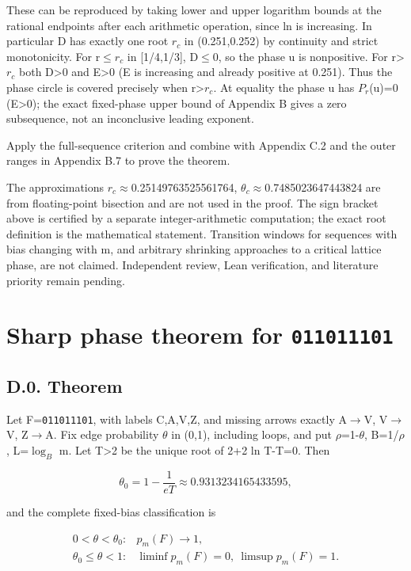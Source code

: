 \documentclass[11pt]{article}
\begin{document}
These can be reproduced by taking lower and upper logarithm bounds at the rational endpoints after each arithmetic operation, since ln is increasing. In particular D has exactly one root $r_{c}$ in (0.251,0.252) by continuity and strict monotonicity. For r\ensuremath{\leq}$r_{c}$ in [1/4,1/3], D\ensuremath{\leq}0, so the phase u is nonpositive. For r>$r_{c}$ both D>0 and E>0 (E is increasing and already positive at 0.251). Thus the phase circle is covered precisely when r>$r_{c}$. At equality the phase u has $P_{r}$(u)=0 (E>0); the exact fixed-phase upper bound of Appendix B gives a zero subsequence, not an inconclusive leading exponent.

Apply the full-sequence criterion and combine with Appendix C.2 and the outer ranges in Appendix B.7 to prove the theorem.

The approximations $r_{c}$\ensuremath{\approx}0.25149763525561764, $\theta_{c}$\ensuremath{\approx}0.7485023647443824 are from floating-point bisection and are not used in the proof. The sign bracket above is certified by a separate integer-arithmetic computation; the exact root definition is the mathematical statement. Transition windows for sequences with bias changing with m, and arbitrary shrinking approaches to a critical lattice phase, are not claimed. Independent review, Lean verification, and literature priority remain pending.

\section{Sharp phase theorem for \texttt{011011101}}

\subsection*{D.0. Theorem}

Let F=\texttt{011011101}, with labels C,A,V,Z, and missing arrows exactly A\ensuremath{\to}V, V\ensuremath{\to}V, Z\ensuremath{\to}A. Fix edge probability $\theta$ in (0,1), including loops, and put $\rho$=1-$\theta$, B=1/$\rho$, L=$\log_B$ m. Let T>2 be the unique root of 2+2 ln T-T=0. Then

\[
\theta_0=1-\frac1{eT}\approx0.9313234165433595,
\]

and the complete fixed-bias classification is

\[
\begin{array}{ll}0<\theta<\theta_0:&p_m(F)\to1,\\
\theta_0\leq\theta<1:&\liminf p_m(F)=0,\ \limsup p_m(F)=1.\end{array}
\]
\end{document}
